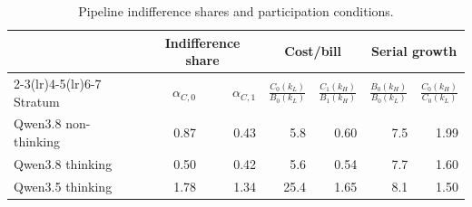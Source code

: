 
\begin{table}[t]
\caption{Pipeline indifference shares and participation conditions.}
\label{tab:h3}
\centering\small\setlength{\tabcolsep}{6pt}
\begin{tabular}{lrrrrrr}
\toprule
 & \multicolumn{2}{c}{Indifference share} & \multicolumn{2}{c}{Cost/bill} & \multicolumn{2}{c}{Serial growth} \\
\cmidrule(lr){2-3}\cmidrule(lr){4-5}\cmidrule(lr){6-7}
Stratum & $\alpha_{C,0}$ & $\alpha_{C,1}$ & $\frac{C_0(k_L)}{B_0(k_L)}$ & $\frac{C_1(k_H)}{B_1(k_H)}$ & $\frac{B_0(k_H)}{B_0(k_L)}$ & $\frac{C_0(k_H)}{C_0(k_L)}$ \\
\midrule
Qwen3.8 non-thinking & 0.87 & 0.43 & 5.8 & 0.60 & 7.5 & 1.99 \\
Qwen3.8 thinking & 0.50 & 0.42 & 5.6 & 0.54 & 7.7 & 1.60 \\
Qwen3.5 thinking & 1.78 & 1.34 & 25.4 & 1.65 & 8.1 & 1.50 \\
\bottomrule
\end{tabular}
\end{table}
